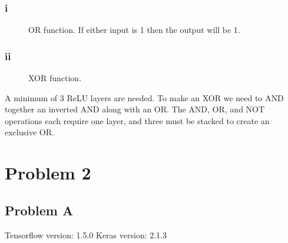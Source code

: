 \documentclass[12pt]{article} %
\begin{document}
\subsubsection{i}
\begin{figure}[H]
	\vspace{-10mm}
	\caption{OR function. If either input is 1 then the output will be 1.}
\end{figure}


\subsubsection{ii}
\begin{figure}[H]
	\vspace{-10mm}
	\caption{XOR function.}
\end{figure}

A minimum of 3 ReLU layers are needed. To make an XOR we need to AND together an inverted AND along with an OR. The AND, OR, and NOT operations each require one layer, and three must be stacked to create an exclusive OR.


\section{Problem 2}
\subsection{Problem A}
Tensorflow version: 1.5.0
Keras version: 2.1.3
\end{document}
